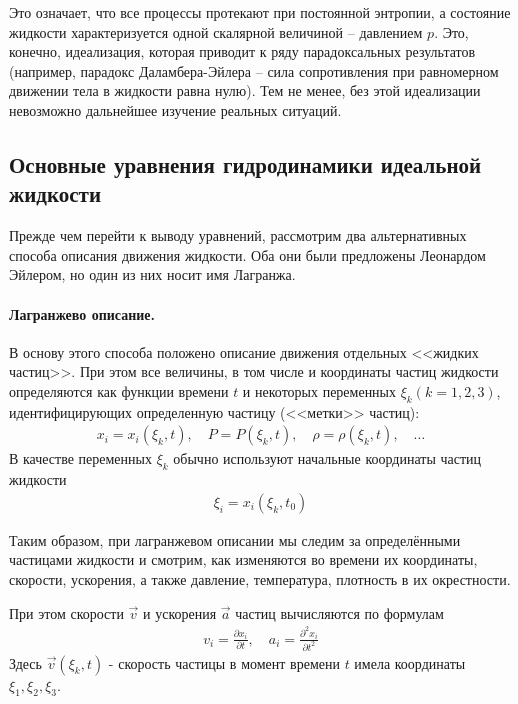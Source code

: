 Это означает, что все процессы протекают при постоянной энтропии, а состояние жидкости характеризуется одной скалярной величиной --  давлением $p$. Это, конечно, идеализация, которая приводит к ряду парадоксальных результатов (например, парадокс  Даламбера-Эйлера --  сила сопротивления при равномерном движении тела в жидкости равна нулю). Тем не менее, без этой идеализации невозможно дальнейшее изучение реальных ситуаций.

\subsection{Основные уравнения гидродинамики идеальной жидкости}
Прежде чем перейти к выводу уравнений, рассмотрим два альтернативных способа описания движения жидкости. Оба они были предложены Леонардом Эйлером, но один из них носит имя Лагранжа.

\paragraph{Лагранжево описание.} В основу этого способа положено описание движения отдельных <<жидких частиц>>. При этом все величины, в том числе и  координаты частиц жидкости определяются как функции времени $t$  и некоторых переменных $\xi_k (k=1,2,3)$, идентифицирующих определенную частицу (<<метки>> частиц):
\begin{align*}
	x_i =x_i(\xi_k,t), \quad
	P =P(\xi_k,t), \quad
	\rho = \rho(\xi_k,t), \quad \ldots 
\end{align*}
В качестве переменных $\xi_k$ обычно используют начальные координаты частиц жидкости
\begin{align*}
	\xi_i = x_i(\xi_k, t_0)
\end{align*}

Таким образом, при лагранжевом описании мы следим за определёнными частицами жидкости и смотрим, как изменяются во времени их координаты,  скорости, ускорения, а также давление, температура, плотность в их окрестности.

При этом скорости $\vec{v}$ и ускорения $\vec{a}$ частиц вычисляются по формулам
\begin{align*}
	v_{i} =\frac{\partial x_{i}}{\partial t}, \quad
	a_{i} =\frac{\partial^{2} x_{i}}{\partial t^{2}} 
\end{align*}
Здесь $ \vec{v}\left(\xi_{k}, t\right) $ - скорость частицы в момент времени $t$ имела координаты $\xi_1,\xi_2,\xi_3$.

